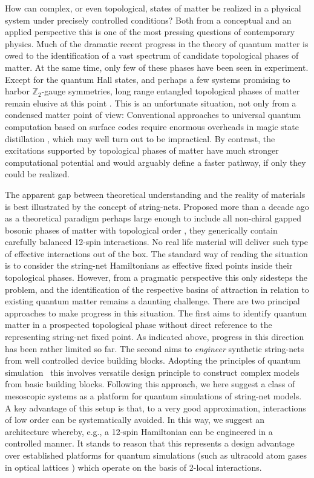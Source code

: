 \documentclass[twocolumn,floats,prx,showpacs]{revtex4-1}
\newcommand{\alex}[1]{{\color{alex} #1}}
\begin{document}
How can complex, or even topological, states of matter be realized in a physical system under precisely controlled conditions? Both from a conceptual and an applied perspective this is one of the most pressing questions of contemporary physics. Much of the dramatic recent progress in the  theory of quantum matter is owed to the identification of a vast spectrum of candidate topological phases of matter. At the same time, only few of these phases have been seen in experiment. Except for the quantum Hall states, and perhaps a few systems promising to harbor $\mathbb{Z}_2$-gauge symmetries, long range entangled topological phases of matter remain elusive at this point \cite{qc3,Wen2017}. This is an unfortunate situation, not only from a condensed matter point of view: Conventional approaches to universal quantum computation based on surface codes \cite{TopologicalQuantumMemory} require  enormous overheads in magic state distillation \cite{PhysRevA.71.022316}, which may well turn out to be impractical. By contrast, the excitations supported by topological phases of matter have much stronger computational potential \cite{Kitaev-AnnPhys-2003,qc3,RevModPhys.87.307} and would arguably define a faster pathway, if only they could be realized.   

The apparent gap between theoretical understanding and the reality of materials is best illustrated by the concept of string-nets. Proposed more than a decade ago as a theoretical paradigm perhaps large enough to include all non-chiral gapped bosonic phases of matter with topological  order \cite{Levin2005,LevinWen,Wen2017}, they generically contain carefully balanced 12-spin interactions. No real life material will deliver such type of effective interactions out of the box. The standard way of reading the situation is to consider the string-net Hamiltonians as effective fixed points inside their topological phases. However, from a pragmatic perspective this only sidesteps the problem, and the identification of the respective basins of attraction in relation to existing quantum matter remains a daunting challenge. 
There are two principal approaches to make progress in this situation. The first aims to identify quantum matter in a prospected topological phase without direct reference to the representing string-net fixed point. As indicated above, progress in this direction has been rather limited so far.
The second aims to \textit{engineer} \alex{synthetic string-nets from well controlled device building blocks. Adopting the principles of 
quantum simulation~\cite{CiracZollerSimulation,Roadmap} this involves  versatile design principle to construct complex models from basic building blocks. Following this approach,  
we here suggest a class of mesoscopic systems as a platform for quantum simulations of string-net models. A key advantage of this setup is that, to a very good approximation, interactions of low order can be systematically avoided. In this way, we suggest an  
architecture whereby, e.g., a 12-spin Hamiltonian can be engineered in a controlled manner. It stands to reason that this represents a design advantage over established platforms for quantum simulations (such as 
ultracold atom gases in optical lattices
\cite{BlochSimulation}) which operate on the basis of  2-local interactions.}
\end{document}
